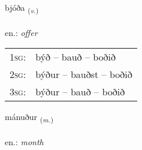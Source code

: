 \documentclass[frontgrid, backgrid]{flacards}\usepackage[]{graphicx}\usepackage[]{xcolor}
\begin{document}
\renewcommand{\blhead}{\vskip5pt {\small\bfseries\footnotesize Sagnorð | Verb }}
\renewcommand{\bcfoot}{\vskip5pt \hspace{2pt}{\small\bfseries\footnotesize 1K}}


{bjóða \small{\textsubscript{(\textit{v.})}} \\[1ex] %
\textphonetic{[pjouːða]} \\
en.: \emph{offer} \\  [2ex]
\renewcommand*{\arraystretch}{0.8}
\begin{tabular}{p{1cm}l}
\textsc{1sg}: & býð -- bauð -- boðið \\ 
\textsc{2sg}: & býður -- bauðst -- boðið \\ 
\textsc{3sg}: & býður -- bauð -- boðið \\ 
\end{tabular}
}

\renewcommand{\flhead}{\vskip5pt \fboxsep=0pt {\small\bfseries\footnotesize Nafnorð | Noun}}
\renewcommand{\fcfoot}{\vskip5pt \fboxsep=0pt \hspace{2pt}{\small\bfseries\footnotesize 1K}}

\renewcommand{\blhead}{\vskip5pt {\small\bfseries\footnotesize Nafnorð | Noun }}
\renewcommand{\bcfoot}{\vskip5pt \hspace{2pt}{\small\bfseries\footnotesize 1K}}


{mánuður \small{\textsubscript{(\textit{m.})}} \\[1ex] %
\textphonetic{[mauːnʏðʏr]} \\
en.: \emph{month} \\  [2ex]
\renewcommand*{\arraystretch}{0.8}
}

\renewcommand{\flhead}{\vskip5pt \fboxsep=0pt {\small\bfseries\footnotesize Lýsingarorð | Adjective}}
\renewcommand{\fcfoot}{\vskip5pt \fboxsep=0pt \hspace{2pt}{\small\bfseries\footnotesize 1K}}
\end{document}
